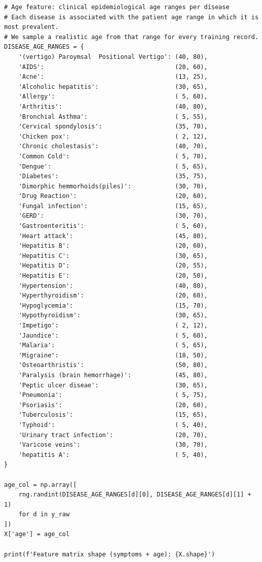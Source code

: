 \documentclass[12pt,a4paper]{article}
\begin{document}
\begin{lstlisting}[caption=Cell 4: 50\% Symptom Dropout and Epidemiological Age Feature]
# Age feature: clinical epidemiological age ranges per disease
# Each disease is associated with the patient age range in which it is most prevalent.
# We sample a realistic age from that range for every training record.
DISEASE_AGE_RANGES = {
    '(vertigo) Paroymsal  Positional Vertigo': (40, 80),
    'AIDS':                                    (20, 60),
    'Acne':                                    (13, 25),
    'Alcoholic hepatitis':                     (30, 65),
    'Allergy':                                 ( 5, 60),
    'Arthritis':                               (40, 80),
    'Bronchial Asthma':                        ( 5, 55),
    'Cervical spondylosis':                    (35, 70),
    'Chicken pox':                             ( 2, 12),
    'Chronic cholestasis':                     (40, 70),
    'Common Cold':                             ( 5, 70),
    'Dengue':                                  ( 5, 65),
    'Diabetes':                                (35, 75),
    'Dimorphic hemmorhoids(piles)':            (30, 70),
    'Drug Reaction':                           (20, 60),
    'Fungal infection':                        (15, 65),
    'GERD':                                    (30, 70),
    'Gastroenteritis':                         ( 5, 60),
    'Heart attack':                            (45, 80),
    'Hepatitis B':                             (20, 60),
    'Hepatitis C':                             (30, 65),
    'Hepatitis D':                             (20, 55),
    'Hepatitis E':                             (20, 50),
    'Hypertension':                            (40, 80),
    'Hyperthyroidism':                         (20, 60),
    'Hypoglycemia':                            (15, 70),
    'Hypothyroidism':                          (30, 65),
    'Impetigo':                                ( 2, 12),
    'Jaundice':                                ( 5, 60),
    'Malaria':                                 ( 5, 65),
    'Migraine':                                (18, 50),
    'Osteoarthristis':                         (50, 80),
    'Paralysis (brain hemorrhage)':            (45, 80),
    'Peptic ulcer diseae':                     (30, 65),
    'Pneumonia':                               ( 5, 75),
    'Psoriasis':                               (20, 60),
    'Tuberculosis':                            (15, 65),
    'Typhoid':                                 ( 5, 40),
    'Urinary tract infection':                 (20, 70),
    'Varicose veins':                          (30, 70),
    'hepatitis A':                             ( 5, 40),
}

age_col = np.array([
    rng.randint(DISEASE_AGE_RANGES[d][0], DISEASE_AGE_RANGES[d][1] + 1)
    for d in y_raw
])
X['age'] = age_col

print(f'Feature matrix shape (symptoms + age): {X.shape}')
\end{lstlisting}
\end{document}
